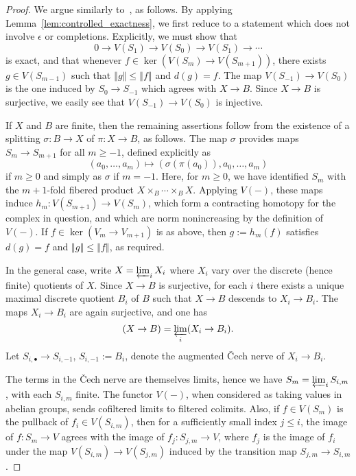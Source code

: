 \begin{proof}
  \leanok
  We argue similarly to~\cite[Theorem 3.3]{Condensed}, as follows.
  By applying Lemma~\ref{lem:controlled_exactness}, we first reduce to a statement which does not involve $\epsilon$ or completions.
  Explicitly, we must show that
  \[ 0 \to V(S_{1}) \to V(S_{0}) \to V(S_{1}) \to \cdots \]
  is exact, and that whenever $f \in \ker(V(S_{m}) \to V(S_{m+1}))$, there exists $g \in V(S_{m-1})$ such that $‖g‖\leq ‖f‖$ and $d(g) = f$.
  The map $V(S_{-1}) \to V(S_{0})$ is the one induced by $S_0 \to S_{-1}$ which agrees with $X \to B$.
  Since $X \to B$ is surjective, we easily see that $V(S_{-1}) \to V(S_{0})$ is injective.

  If $X$ and $B$ are finite, then the remaining assertions follow from the existence of a splitting $\sigma : B \to X$ of $\pi : X \to B$, as follows.
  The map $\sigma$ provides maps $S_{m} \to S_{m+1}$ for all $m \geq -1$, defined explicitly as
  \[ (a_{0},\ldots,a_{m}) \mapsto (\sigma (\pi (a_{0})), a_{0},\ldots,a_{m}) \]
  if $m \geq 0$ and simply as $\sigma$ if $m = -1$.
  Here, for $m \geq 0$, we have identified $S_{m}$ with the $m+1$-fold fibered product $X \times_{B} \cdots \times_{B} X$.
  Applying $V(-)$, these maps induce $h_{m} : V(S_{m+1}) \to V(S_{m})$, which form a contracting homotopy for the complex in question, and which are norm nonincreasing by the definition of $V(-)$.
  If $f \in \ker(V_{m} \to V_{m+1})$ is as above, then $g := h_{m}(f)$ satisfies $d(g) = f$ and $‖g‖\leq ‖f‖$, as required.

  In the general case, write $X = \varprojlim_{i} X_{i}$ where $X_{i}$ vary over the discrete (hence finite) quotients of $X$.
  Since $X \to B$ is surjective, for each $i$ there exists a unique maximal discrete quotient $B_{i}$ of $B$ such that $X \to B$ descends to $X_{i} \to B_{i}$.
  The maps $X_{i} \to B_{i}$ are again surjective, and one has
  \[ (X \to B) = \varprojlim_{i} (X_{i} \to B_{i}). \]
  Let $S_{i,\bullet} \to S_{i,-1}$, $S_{i,-1} := B_{i}$, denote the augmented \v{C}ech nerve of $X_{i} \to B_{i}$.

  The terms in the \v{C}ech nerve are themselves limits, hence we have $S_{m} = \varprojlim_{i} S_{i,m}$, with each $S_{i,m}$ finite.
  The functor $V(-)$, when considered as taking values in abelian groups, sends cofiltered limits to filtered colimits.
  Also, if $f \in V(S_{m})$ is the pullback of $f_{i} \in V(S_{i,m})$, then for a sufficiently small index $j \leq i$, the image of $f : S_{m} \to V$ agrees with the image of $f_{j} : S_{j,m} \to V$, where $f_{j}$ is the image of $f_{i}$ under the map $V(S_{i,m}) \to V(S_{j,m})$ induced by the transition map $S_{j,m} \to S_{i,m}$.


\end{proof}
